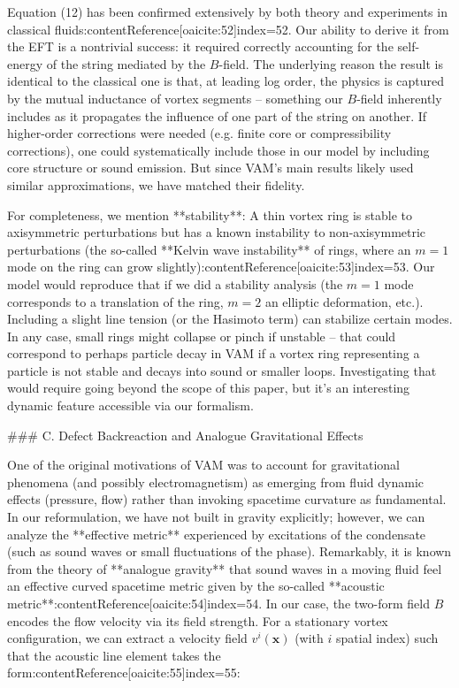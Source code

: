 \documentclass[12pt]{article}
\begin{document}
Equation (12) has been confirmed extensively by both theory and experiments in classical fluids:contentReference[oaicite:52]{index=52}. Our ability to derive it from the EFT is a nontrivial success: it required correctly accounting for the self-energy of the string mediated by the $B$-field. The underlying reason the result is identical to the classical one is that, at leading log order, the physics is captured by the mutual inductance of vortex segments – something our $B$-field inherently includes as it propagates the influence of one part of the string on another. If higher-order corrections were needed (e.g. finite core or compressibility corrections), one could systematically include those in our model by including core structure or sound emission. But since VAM’s main results likely used similar approximations, we have matched their fidelity.

For completeness, we mention **stability**: A thin vortex ring is stable to axisymmetric perturbations but has a known instability to non-axisymmetric perturbations (the so-called **Kelvin wave instability** of rings, where an $m=1$ mode on the ring can grow slightly):contentReference[oaicite:53]{index=53}. Our model would reproduce that if we did a stability analysis (the $m=1$ mode corresponds to a translation of the ring, $m=2$ an elliptic deformation, etc.). Including a slight line tension (or the Hasimoto term) can stabilize certain modes. In any case, small rings might collapse or pinch if unstable – that could correspond to perhaps particle decay in VAM if a vortex ring representing a particle is not stable and decays into sound or smaller loops. Investigating that would require going beyond the scope of this paper, but it’s an interesting dynamic feature accessible via our formalism.

### C. Defect Backreaction and Analogue Gravitational Effects

One of the original motivations of VAM was to account for gravitational phenomena (and possibly electromagnetism) as emerging from fluid dynamic effects (pressure, flow) rather than invoking spacetime curvature as fundamental. In our reformulation, we have not built in gravity explicitly; however, we can analyze the **effective metric** experienced by excitations of the condensate (such as sound waves or small fluctuations of the phase). Remarkably, it is known from the theory of **analogue gravity** that sound waves in a moving fluid feel an effective curved spacetime metric given by the so-called **acoustic metric**:contentReference[oaicite:54]{index=54}. In our case, the two-form field $B$ encodes the flow velocity via its field strength. For a stationary vortex configuration, we can extract a velocity field $v^i(\mathbf{x})$ (with $i$ spatial index) such that the acoustic line element takes the form:contentReference[oaicite:55]{index=55}:
\end{document}
